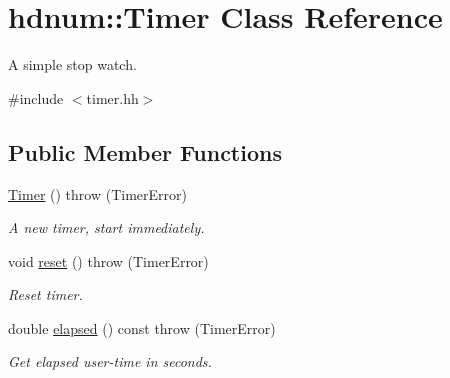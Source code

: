 \hypertarget{classhdnum_1_1Timer}{
\section{hdnum::Timer Class Reference}
\label{classhdnum_1_1Timer}
}


A simple stop watch.  




{\ttfamily \#include $<$timer.hh$>$}

\subsection*{Public Member Functions}
\begin{DoxyCompactItemize}
\item 
\hypertarget{classhdnum_1_1Timer_aa21efdb01cfd44867a39d6321764f368}{
\hyperlink{classhdnum_1_1Timer_aa21efdb01cfd44867a39d6321764f368}{Timer} ()  throw (TimerError)}
\label{classhdnum_1_1Timer_aa21efdb01cfd44867a39d6321764f368}

\begin{DoxyCompactList}\small\item\em A new timer, start immediately. \item\end{DoxyCompactList}\item 
\hypertarget{classhdnum_1_1Timer_ad9169c761853bd68249ce1a5d4af1511}{
void \hyperlink{classhdnum_1_1Timer_ad9169c761853bd68249ce1a5d4af1511}{reset} ()  throw (TimerError)}
\label{classhdnum_1_1Timer_ad9169c761853bd68249ce1a5d4af1511}

\begin{DoxyCompactList}\small\item\em Reset timer. \item\end{DoxyCompactList}\item 
\hypertarget{classhdnum_1_1Timer_adc1329694ff6a7bea6e05929ca9e3736}{
double \hyperlink{classhdnum_1_1Timer_adc1329694ff6a7bea6e05929ca9e3736}{elapsed} () const   throw (TimerError)}
\label{classhdnum_1_1Timer_adc1329694ff6a7bea6e05929ca9e3736}

\begin{DoxyCompactList}\small\item\em Get elapsed user-\/time in seconds. \item\end{DoxyCompactList}\end{DoxyCompactItemize}


